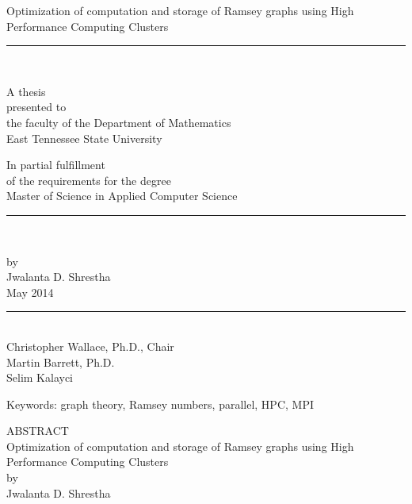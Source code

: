 \documentclass[12pt]{etsu_thesis}
\begin{document}
\thispagestyle{empty}


\begin{center}
{Optimization of computation and storage of Ramsey graphs using High Performance Computing Clusters \\
[.04in]} \rm
\rule{1.25in}{.005in}\\[.0 in]

\vspace{.15in}

A thesis \\ [.04in]
presented to \\ [.04in]
the faculty of the Department of Mathematics \\[.04in]
East Tennessee State University \\ [.04in]

\vspace{.15in}

In partial fulfillment \\[.04in]of the requirements for the degree \\
[.04in] Master of Science in Applied Computer Science \\ [.04in]
\rule{1.25in}{.005in}\\

\vspace{.15in}

by  \\ [.04in]
{ Jwalanta D. Shrestha } \\[.04in]
{May 2014} \\[.04in]
\rule{1.25in}{.005in}\\

\vspace{.15in}
Christopher Wallace, Ph.D., Chair \\[.04in]
Martin Barrett, Ph.D. \\[.04in]
Selim Kalayci \\[.04in]

\vspace{.15in}

Keywords: graph theory, Ramsey numbers, parallel, HPC, MPI


\end{center}
\newpage
\pagestyle{plain}
\begin{center}
{ ABSTRACT}\\
{ Optimization of computation and storage of Ramsey graphs using High Performance Computing Clusters \\ } by \\
[.1in]

{ Jwalanta D. Shrestha}\\[.1in]

\end{center}
\end{document}

